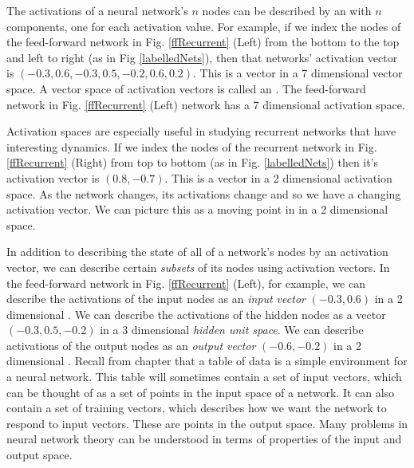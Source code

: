   The activations of a neural network's $n$ nodes can be described by an  with $n$ components, one for each activation value. For example, if we index the nodes of the feed-forward network in Fig. \ref{ffRecurrent} (Left) from the bottom to the top and left to right (as in Fig \ref{labelledNets}), then that networks' activation vector is $(-0.3,0.6,-0.3,0.5,-0.2,0.6,0.2)$. This 
is a vector in a 7 dimensional vector space. A vector space of activation 
vectors is called an . The feed-forward network in Fig. \ref{ffRecurrent} (Left)  network has a 7 dimensional activation space.

Activation spaces are especially useful in studying recurrent networks that have interesting dynamics.
If we index the nodes of the recurrent network in Fig. 
\ref{ffRecurrent} (Right) from top to bottom (as in Fig. \ref{labelledNets}) then it's activation vector is $(0.8,-0.7)$. This is a vector in a 2 dimensional activation
space. As the network changes, its  activations change and so we have a changing activation vector. We can picture  this as a moving point in in a 2 dimensional space. 

In addition to describing the state of all of a network's nodes by an activation vector, we can describe certain {\em subsets} of its nodes using activation vectors. In the feed-forward network in Fig. \ref{ffRecurrent} (Left), for example, we can describe the activations of the input nodes as an  \emph{input vector}  $(-0.3,0.6)$  in a 2 dimensional . We can describe the activations of the hidden nodes as a vector $(-0.3,0.5,-0.2)$ in a 3 dimensional 
\emph{hidden unit space}. We can describe activations of the output nodes as an \emph{output vector} $(-0.6,-0.2)$ in a 2 dimensional . Recall from chapter  that a table of data is a simple environment for a neural network. This table will sometimes contain a set of input vectors, which can be thought of as a set of points in the input space of a network. It can also contain a set of training vectors, which describes how we want the network to respond to input vectors. These are points in the output space. Many problems in neural network theory can be understood in terms of properties of the input and output space.
 
